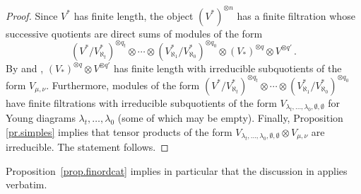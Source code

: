 \documentclass[11pt]{article}
\theoremstyle{plain}
\theoremstyle{nonumberplain}
\theoremstyle{plain}
\theoremstyle{nonumberplain}
\newtheorem{proof}{Proof}
\newcommand\bT{\mathbb T}
\newcommand\al{\aleph}
\begin{document}
\begin{proof}
	Since $V^*$ has finite length, the object $\left(V^*\right)^{\otimes n}$ has a finite filtration whose successive quotients are direct sums of modules of the form $$\left(V^*/V^*_{\aleph_t}\right)^{\otimes q_t}\otimes \cdots \otimes \left(V^*_{\aleph_{1}} / V^*_{\aleph_0}\right)^{\otimes q_0}\otimes \left(V_*\right)^{\otimes q} \otimes V^{\otimes q'}\,.$$	
By \cite{PS2} and \cite{PS}, $\left(V_*\right)^{\otimes q} \otimes V^{\otimes q'}$ has finite length with irreducible subquotients of the form $V_{\mu,\nu}$.  Furthermore, modules of the form $\left(V^*/V^*_{\aleph_t}\right)^{\otimes q_t}\otimes \cdots \otimes \left(V^*_{\aleph_{1}} / V^*_{\aleph_0}\right)^{\otimes q_0}$ have finite filtrations with irreducible subquotients of the form $V_{\lambda_t,\ldots,\lambda_0,\emptyset,\emptyset}$ for Young diagrams $\lambda_t,\ldots,\lambda_0$ (some of which may be empty).   Finally, Proposition \ref{pr.simples} implies that tensor products of the form $V_{\lambda_t,\ldots,\lambda_0,\emptyset,\emptyset}\otimes V_{\mu,\nu}$ are irreducible.  The statement follows.
\end{proof}

	Proposition~\ref{prop.finordcat} implies in particular that the discussion in \cite[Section 2]{us} applies verbatim.


%
%
\end{document}
